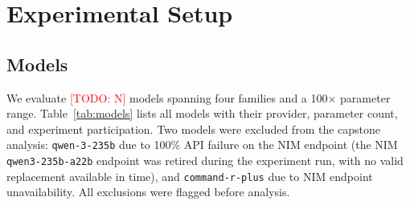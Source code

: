 \documentclass[10pt]{article}
\newcommand{\todo}[1]{\textcolor{red}{[TODO: #1]}}
\begin{document}
\section{Experimental Setup}
\label{sec:setup}

\subsection{Models}

We evaluate \todo{N} models spanning four families and a 100$\times$ parameter range.
Table~\ref{tab:models} lists all models with their provider, parameter count, and
experiment participation. Two models were excluded from the capstone analysis:
\texttt{qwen-3-235b} due to 100\% API failure on the NIM endpoint (the NIM
\texttt{qwen3-235b-a22b} endpoint was retired during the experiment run, with no
valid replacement available in time), and \texttt{command-r-plus} due to NIM endpoint
unavailability. All exclusions were flagged before analysis.
\end{document}
